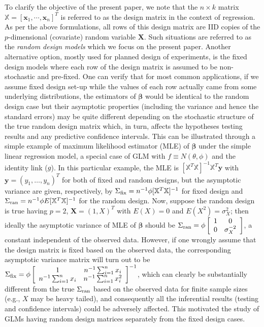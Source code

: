 \documentclass[a4paper]{article}%
\begin{document}
To clarify the objective of the present paper, we note that the $n\times k$ matrix 
$\mathbb{X} = [\boldsymbol{x}_1, \cdots, \boldsymbol{x}_n]^T$ is referred to as the design matrix 
in the context of regression. As per the above formulations, all rows of this design matrix are 
IID copies of the $p$-dimensional (covariate) random variable $\boldsymbol{X}$. 
Such situations are referred to as the \textit{random design models} which we focus on the present paper. 
Another alternative option, mostly used for planned design of experiments, is the fixed design models
where each row of the design matrix is assumed to be non-stochastic and pre-fixed.
One can verify that for most common applications, if we assume fixed design set-up
while the values of each row actually came from some underlying distributions,
the estimators of $\boldsymbol{\beta}$ would be identical to the random design case 
but their asymptotic properties (including the variance and hence the standard errors) 
may be quite different depending  on the stochastic structure of the true random design matrix
which, in turn, affects the hypotheses testing results and any predictive confidence intervals.
This can be illustrated through a simple example of maximum likelihood estimator (MLE) of $\boldsymbol{\beta}$ 
under the simple linear regression model, a special case of GLM with $f\equiv N(\theta, \phi)$ and the identity link ($g$).
In this particular example, the MLE is $[\mathbb{X}^T\mathbb{X}]^{-1}\mathbb{X}^T\boldsymbol{y}$
with $\boldsymbol{y}=(y_1, \ldots, y_n)^T$ for both of fixed and random designs,
but the asymptotic variance are given, respectively, by $\Sigma_{\rm fix} = n^{-1}\phi[\mathbb{X}^T\mathbb{X}]^{-1}$ 
for fixed design and $\Sigma_{\rm ran} = n^{-1}\phi E[\mathbb{X}^T\mathbb{X}]^{-1}$ for the random design.
Now, suppose the random design is true having  $p=2$, $\boldsymbol{X}=(1, X)^T$ with $E(X)=0$ and $E(X^2)=\sigma_X^2$;
then ideally the asymptotic variance of MLE of $\boldsymbol{\beta}$ should be 
$\Sigma_{\rm ran} =\phi \begin{bmatrix}
\begin{array}{cc}
1 & 0\\
0 & \sigma_X^{-2}
\end{array}
\end{bmatrix}$, 
a constant independent of the observed data. 
However, if one wrongly assume that the design matrix is fixed based on the observed data,
the corresponding asymptotic variance matrix will turn out to be  
$\Sigma_{\rm fix} =\phi \begin{bmatrix}
\begin{array}{cc}
1 & n^{-1}\sum_{i=1}^nx_i \\
n^{-1}\sum_{i=1}^nx_i  & n^{-1}\sum_{i=1}^nx_i^2 
\end{array}
\end{bmatrix}^{-1}$, 
which can clearly be substantially different from the true $\Sigma_{\rm ran}$ based on the observed data 
for finite sample sizes (e.g., $X$ may be heavy tailed), 
and consequently all the inferential results (testing and confidence intervals) could be adversely affected. 
This motivated the study of GLMs having random design matrices separately from the fixed design cases. 
\end{document}
